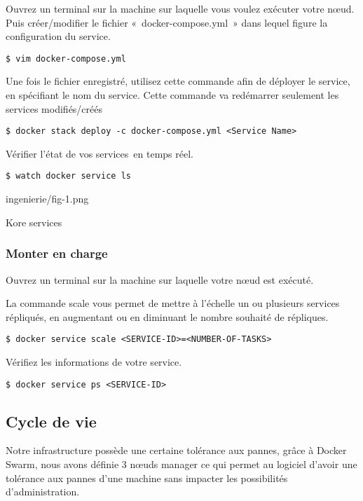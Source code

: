 Ouvrez un terminal sur la machine sur laquelle vous voulez exécuter
votre nœud. Puis créer/modifier le fichier «~docker-compose.yml~» dans
lequel figure la configuration du service.

\begin{lstlisting}
$ vim docker-compose.yml
\end{lstlisting}

Une fois le fichier enregistré, utilisez cette commande afin de déployer
le service, en spécifiant le nom du service. Cette commande va
redémarrer seulement les services modifiés/créés

\begin{lstlisting}
$ docker stack deploy -c docker-compose.yml <Service Name>
\end{lstlisting}

Vérifier l'état de vos services~en temps réel.

\begin{lstlisting}
$ watch docker service ls
\end{lstlisting}

\begin{figue}{1}{ingenierie/fig-1.png}
\caption{Kore services}
\end{figue}

\subsubsection{Monter en charge}

Ouvrez un terminal sur la machine sur laquelle votre nœud est exécuté.

La commande scale vous permet de mettre à l'échelle un ou plusieurs
services répliqués, en augmentant ou en diminuant le nombre souhaité de
répliques.

\begin{lstlisting}
$ docker service scale <SERVICE-ID>=<NUMBER-OF-TASKS>
\end{lstlisting}

Vérifiez les informations de votre service.

\begin{lstlisting}
$ docker service ps <SERVICE-ID>
\end{lstlisting}

\subsection{Cycle de vie}

Notre infrastructure possède une certaine tolérance aux pannes, grâce à
Docker Swarm, nous avons définie 3 nœuds manager ce qui permet au
logiciel d'avoir une tolérance aux pannes d'une machine sans impacter
les possibilités d'administration.

